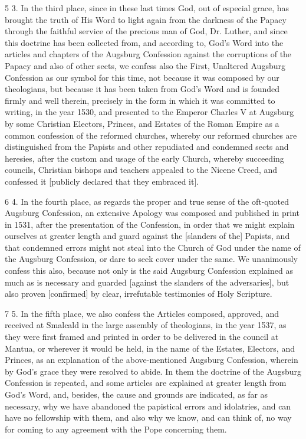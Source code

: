 5 3. In the third place, since in these last times God, out of especial grace, has brought the truth of His Word to light again from the darkness of the Papacy through the faithful service of the precious man of God, Dr. Luther, and since this doctrine has been collected from, and according to, God’s Word into the articles and chapters of the Augsburg Confession against the corruptions of the Papacy and also of other sects, we confess also the First, Unaltered Augsburg Confession as our symbol for this time, not because it was composed by our theologians, but because it has been taken from God’s Word and is founded firmly and well therein, precisely in the form in which it was committed to writing, in the year 1530, and presented to the Emperor Charles V at Augsburg by some Christian Electors, Princes, and Estates of the Roman Empire as a common confession of the reformed churches, whereby our reformed churches are distinguished from the Papists and other repudiated and condemned sects and heresies, after the custom and usage of the early Church, whereby succeeding councils, Christian bishops and teachers appealed to the Nicene Creed, and confessed it [publicly declared that they embraced it].

6 4. In the fourth place, as regards the proper and true sense of the oft-quoted Augsburg Confession, an extensive Apology was composed and published in print in 1531, after the presentation of the Confession, in order that we might explain ourselves at greater length and guard against the [slanders of the] Papists, and that condemned errors might not steal into the Church of God under the name of the Augsburg Confession, or dare to seek cover under the same. We unanimously confess this also, because not only is the said Augsburg Confession explained as much as is necessary and guarded [against the slanders of the adversaries], but also proven [confirmed] by clear, irrefutable testimonies of Holy Scripture.

7 5. In the fifth place, we also confess the Articles composed, approved, and received at Smalcald in the large assembly of theologians, in the year 1537, as they were first framed and printed in order to be delivered in the council at Mantua, or wherever it would be held, in the name of the Estates, Electors, and Princes, as an explanation of the above-mentioned Augsburg Confession, wherein by God’s grace they were resolved to abide. In them the doctrine of the Augsburg Confession is repeated, and some articles are explained at greater length from God’s Word, and, besides, the cause and grounds are indicated, as far as necessary, why we have abandoned the papistical errors and idolatries, and can have no fellowship with them, and also why we know, and can think of, no way for coming to any agreement with the Pope concerning them.

